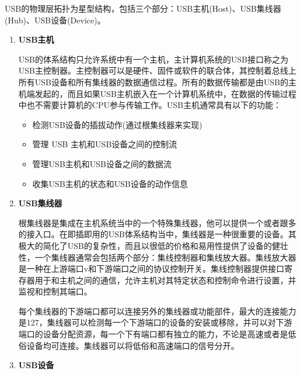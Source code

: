 	USB的物理层拓扑为星型结构，包括三个部分：USB主机(Host)、USB集线器(Hub)、USB设备(Device)。
	
\begin{enumerate}
\item \textbf{USB主机}

	USB的体系结构只允许系统中有一个主机，主计算机系统的USB接口称之为USB主控制器。主控制器可以是硬件、固件或软件的联合体，其控制着总线上所有USB设备和所有集线器的数据通信过程。所有的数据传输都是由USB的主机端发起的，而且如果USB主机嵌入在一个计算机系统中，在数据的传输过程中也不需要计算机的CPU参与传输工作。USB主机通常具有以下的功能：
	\begin{itemize}
	\item 检测USB设备的插拔动作(通过根集线器来实现)
	\item 管理 USB 主机和USB设备之间的控制流
	\item 管理USB主机和USB设备之间的数据流
	\item 收集USB主机的状态和USB设备的动作信息
	\end{itemize}
\item \textbf{USB集线器}
	
	根集线器是集成在主机系统当中的一个特殊集线器，他可以提供一个或者跟多的接入口。在即插即用的USB体系结构当中，集线器是一种很重要的设备。其极大的简化了USB的复杂性，而且以很低的价格和易用性提供了设备的健壮性，一个集线器通常会包括两个部分：集线控制器和集线放大器。集线放大器是一种在上游端口v和下游端口之间的协议控制开关。集线控制器提供接口寄存器用于和主机之间的通信，允许主机对其特定状态和控制命令进行设置，并监视和控制其端口。

每个集线器的下游端口都可以连接另外的集线器或功能部件，最大的连接能力是127，集线器可以检测每一个下游端口的设备的安装或移除，并可以对下游端口的设备分配资源，每一个下有端口都有独立的能力，不论是高速或者是低俗设备均可连接。集线器可以将低俗和高速端口的信号分开。

\item \textbf{USB设备}


\end{enumerate}
